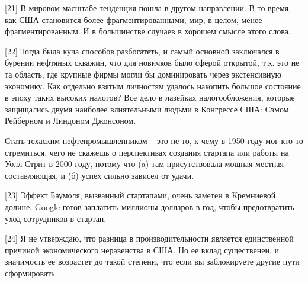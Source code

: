 \documentclass[ebook,12pt,oneside,openany]{memoir}
\begin{document}
[21] В мировом масштабе тенденция пошла в другом направлении. В то
время, как США становится более фрагментированными, мир, в целом,
менее фрагментированным. И в большинстве случаев в хорошем смысле
этого слова. \newline

[22] Тогда была куча способов разбогатеть, и самый основной заключался
в бурении нефтяных скважин, что для новичков было сферой открытой,
т.к. это не та область, где крупные фирмы могли бы доминировать через
экстенсивную экономику. Как отдельно взятым личностям удалось накопить
большое состояние в эпоху таких высоких налогов? Все дело в лазейках
налогообложения, которые защищались двумя наиболее влиятельными людьми
в Конгрессе США: Сэмом Рейберном и Линдоном Джонсоном. \newline

Стать техаским нефтепромышленником – это не то, к чему в 1950 году мог
кто-то стремиться, чего не скажешь о перспективах создания стартапа
или работы на Уолл Стрит в 2000 году, потому что (a) там
присутствовала мощная местная составляющая, и (б) успех сильно зависел
от удачи. \newline

[23] Эффект Баумоля, вызванный стартапами, очень заметен в Кремниевой
долине. Google готов заплатить миллионы долларов в год, чтобы
предотвратить уход сотрудников в стартап. \newline

[24] Я не утверждаю, что разница в производительности является
единственной причиной экономического неравенства в США. Но ее вклад
существенен, и значимость ее возрастет до такой степени, что если вы
заблокируете другие пути сформировать
\end{document}
